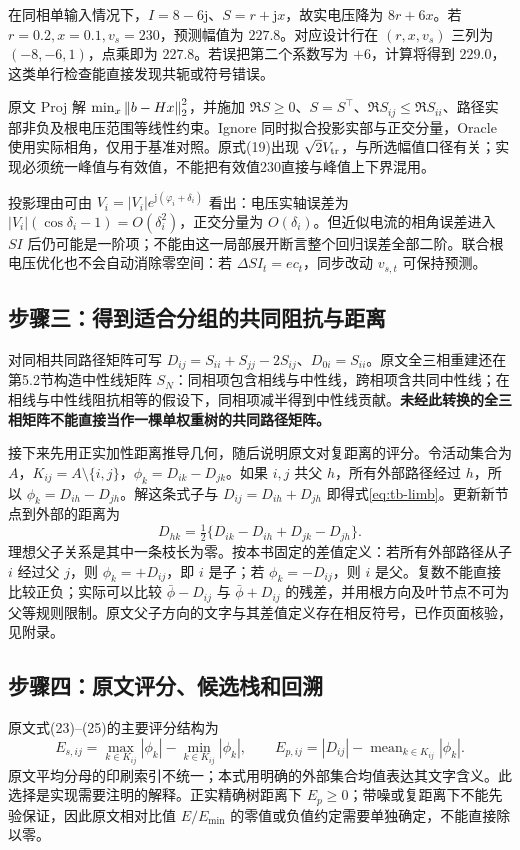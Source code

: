 \begin{example}[一行回归的数值检查]
在同相单输入情况下，$I=8-6\mathrm j$、$S=r+\mathrm j x$，故实电压降为 $8r+6x$。若 $r=0.2,x=0.1,v_s=230$，预测幅值为 $227.8$。对应设计行在 $(r,x,v_s)$ 三列为 $(-8,-6,1)$，点乘即为 $227.8$。若误把第二个系数写为 $+6$，计算将得到 $229.0$，这类单行检查能直接发现共轭或符号错误。
\end{example}

原文 Proj 解 $\min_x\left\lVert b-Hx\right\rVert_2^2$，并施加 $\Re S\geq0$、$S=S^\top$、$\Re S_{ij}\leq\Re S_{ii}$、路径实部非负及根电压范围等线性约束。Ignore 同时拟合投影实部与正交分量，Oracle 使用实际相角，仅用于基准对照。原式(19)出现 $\sqrt2V_{\rm tr}$，与所选幅值口径有关；实现必须统一峰值与有效值，不能把有效值230直接与峰值上下界混用。

投影理由可由 $V_i=|V_i|e^{\mathrm j(\varphi_i+\delta_i)}$ 看出：电压实轴误差为 $|V_i|(\cos\delta_i-1)=O(\delta_i^2)$，正交分量为 $O(\delta_i)$。但近似电流的相角误差进入 $SI$ 后仍可能是一阶项；不能由这一局部展开断言整个回归误差全部二阶。联合根电压优化也不会自动消除零空间：若 $\Delta S I_t=e c_t$，同步改动 $v_{s,t}$ 可保持预测。

\subsection{步骤三：得到适合分组的共同阻抗与距离}
对同相共同路径矩阵可写 $D_{ij}=S_{ii}+S_{jj}-2S_{ij}$、$D_{0i}=S_{ii}$。原文全三相重建还在第5.2节构造中性线矩阵 $S_N$：同相项包含相线与中性线，跨相项含共同中性线；在相线与中性线阻抗相等的假设下，同相项减半得到中性线贡献。\textbf{未经此转换的全三相矩阵不能直接当作一棵单权重树的共同路径矩阵。}

接下来先用正实加性距离推导几何，随后说明原文对复距离的评分。令活动集合为 $A$，$K_{ij}=A\setminus\{i,j\}$，$\phi_k=D_{ik}-D_{jk}$。如果 $i,j$ 共父 $h$，所有外部路径经过 $h$，所以 $\phi_k=D_{ih}-D_{jh}$。解这条式子与 $D_{ij}=D_{ih}+D_{jh}$ 即得式\eqref{eq:tb-limb}。更新新节点到外部的距离为
\begin{equation}
 D_{hk}=\tfrac12\{D_{ik}-D_{ih}+D_{jk}-D_{jh}\}.
 \label{eq:tb-s3-distance-update}
\end{equation}
理想父子关系是其中一条枝长为零。按本书固定的差值定义：若所有外部路径从子 $i$ 经过父 $j$，则 $\phi_k=+D_{ij}$，即 $i$ 是子；若 $\phi_k=-D_{ij}$，则 $i$ 是父。复数不能直接比较正负；实际可以比较 $\bar\phi-D_{ij}$ 与 $\bar\phi+D_{ij}$ 的残差，并用根方向及叶节点不可为父等规则限制。原文父子方向的文字与其差值定义存在相反符号，已作页面核验，见附录。

\subsection{步骤四：原文评分、候选栈和回溯}
原文式(23)--(25)的主要评分结构为
\begin{equation}
 E_{s,ij}=\max_{k\in K_{ij}}|\phi_k|-\min_{k\in K_{ij}}|\phi_k|,
 \qquad E_{p,ij}=|D_{ij}|-\operatorname{mean}_{k\in K_{ij}}|\phi_k|.
 \label{eq:tb-s3-scores}
\end{equation}
原文平均分母的印刷索引不统一；本式用明确的外部集合均值表达其文字含义。此选择是实现需要注明的解释。正实精确树距离下 $E_p\geq0$；带噪或复距离下不能先验保证，因此原文相对比值 $E/E_{\min}$ 的零值或负值约定需要单独确定，不能直接除以零。

